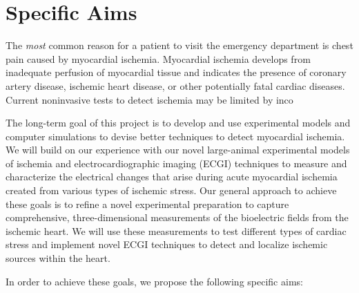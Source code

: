 %


%

\section{Specific Aims}

The \textit{most} common reason for a patient to visit the emergency
department is chest pain caused by myocardial ischemia. Myocardial ischemia
develops from inadequate perfusion of myocardial tissue and indicates the
presence of coronary artery disease, ischemic heart disease, or other
potentially fatal cardiac diseases. Current noninvasive tests to detect
ischemia may be limited by inco

The long-term goal of this project is to develop and use experimental
models and computer simulations to devise better techniques to detect
myocardial ischemia. We will build on our experience with our novel large-animal
experimental models of ischemia and electrocardiographic imaging (ECGI)
techniques to measure and characterize the electrical changes that arise
during acute myocardial ischemia created from various types of ischemic
stress. Our general approach to achieve these goals is to refine a novel
experimental preparation to capture comprehensive, three-dimensional
measurements of the bioelectric fields from the ischemic heart. We will use
these measurements to test different types of cardiac stress and implement novel
ECGI techniques to detect and localize ischemic sources within the heart.



%

In order to achieve these goals, we propose the following specific aims: 
\vspace{-.1in} %

